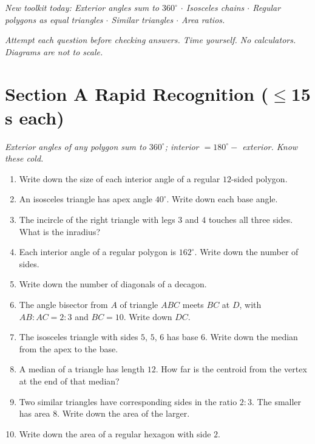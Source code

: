 \documentclass[11pt,a4paper]{article}
\begin{document}
\noindent\textit{New toolkit today: Exterior angles sum to $360^\circ$ $\cdot$ Isosceles chains $\cdot$ Regular polygons as equal triangles $\cdot$ Similar triangles $\cdot$ Area ratios.}

\vspace{2pt}
\noindent\textit{Attempt each question before checking answers. Time yourself. No calculators. Diagrams are not to scale.}

\section*{Section A \quad Rapid Recognition \hfill{\normalfont\small($\leq$15 s each)}}

\noindent\textit{Exterior angles of any polygon sum to $360^\circ$; interior $=180^\circ-$ exterior. Know these cold.}

\begin{enumerate}

\item Write down the size of each interior angle of a regular $12$-sided polygon.

\item An isosceles triangle has apex angle $40^\circ$. Write down each base angle.

\item The incircle of the right triangle with legs $3$ and $4$ touches all three sides. What is the inradius?

\item Each interior angle of a regular polygon is $162^\circ$. Write down the number of sides.

\item Write down the number of diagonals of a decagon.

\item The angle bisector from $A$ of triangle $ABC$ meets $BC$ at $D$, with $AB:AC = 2:3$ and $BC=10$. Write down $DC$.

\item The isosceles triangle with sides $5$, $5$, $6$ has base $6$. Write down the median from the apex to the base.

\item A median of a triangle has length $12$. How far is the centroid from the vertex at the end of that median?

\item Two similar triangles have corresponding sides in the ratio $2:3$. The smaller has area $8$. Write down the area of the larger.

\item Write down the area of a regular hexagon with side $2$.

\end{enumerate}
\end{document}

